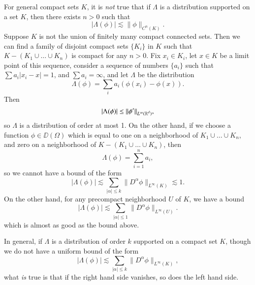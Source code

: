 \begin{remark}
    For general compact sets $K$, it is \emph{not} true that if $\Lambda$ is a distribution supported on a set $K$, then there exists $n > 0$ such that
    \[ |\Lambda(\phi)| \lesssim \| \phi \|_{C^n(K)}. \]
    Suppose $K$ is not the union of finitely many compact connected sets. Then we can find a family of disjoint compact sets $\{ K_i \}$ in $K$ such that $K - (K_1 \cup \dots \cup K_n)$ is compact for any $n > 0$. Fix $x_i \in K_i$, let $x \in K$ be a limit point of this sequence, consider a sequence of numbers $\{ a_i \}$ such that $\sum a_i |x_i - x| = 1$, and $\sum a_i = \infty$, and let $\Lambda$ be the distribution
    \[ \Lambda(\phi) = \sum_i a_i (\phi(x_i) - \phi(x)). \]
    Then
    \[ |\Lambda(\phi)| \leq \| \phi' \|_{L^\infty(\operatorname{\mathbb{R}}^d)}, \]
    so $\Lambda$ is a distribution of order at most 1. On the other hand, if we choose a function $\phi \in \DD(\Omega)$ which is equal to one on a neighborhood of $K_1 \cup \dots \cup K_n$, and zero on a neighborhood of $K - (K_1 \cup \dots \cup K_n)$, then
    \[ \Lambda(\phi) = \sum_{i = 1}^n a_i, \]
    so we cannot have a bound of the form
    \[ |\Lambda(\phi)| \lesssim \sum_{|\alpha| \leq k} \| D^\alpha \phi \|_{L^\infty(K)} \lesssim 1. \]
    On the other hand, for any precompact neighborhood $U$ of $K$, we have a bound
    \[ |\Lambda(\phi)| \lesssim \sum_{|\alpha| \leq 1} \| D^\alpha \phi \|_{L^\infty(U)}. \]
    which is almost as good as the bound above.
\end{remark}

In general, if $\Lambda$ is a distribution of order $k$ supported on a compact set $K$, though we do not have a uniform bound of the form
%
\[ |\Lambda(\phi)| \lesssim \sum_{|\alpha| \leq k} \| D^\alpha \phi \|_{L^\infty(K)}, \]
%
what \emph{is} true is that if the right hand side vanishes, so does the left hand side.

